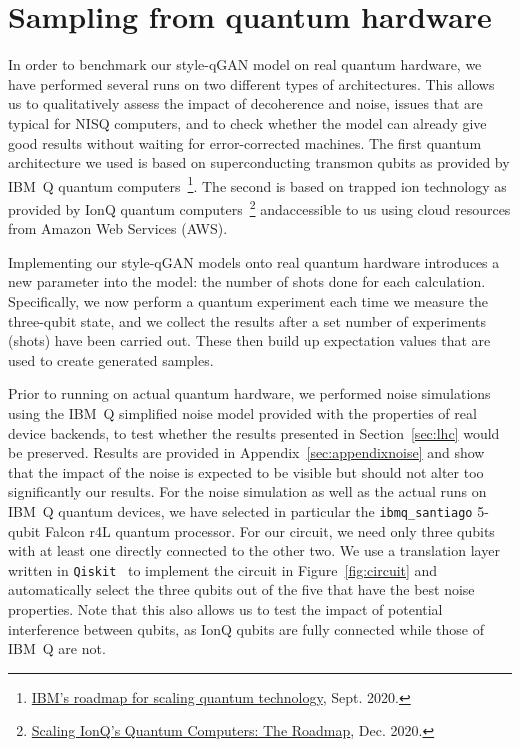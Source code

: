 \documentclass[twocolumn,preprintnumbers,superscriptaddress]{revtex4-2}
\begin{document}
\section{Sampling from quantum hardware}
\label{sec:deployment}

In order to benchmark our style-qGAN model on real quantum hardware, we
have performed several runs on two different types of
architectures. This allows us to qualitatively assess the impact of
decoherence and noise, issues that are typical for NISQ computers, and
to check whether the model can already give good results without
waiting for error-corrected machines. The first quantum architecture we used is based on
superconducting transmon qubits as provided by IBM~Q
quantum computers~\footnote{\href{https://research.ibm.com/blog/ibm-quantum-roadmap}{IBM's roadmap for scaling quantum technology}, Sept. 2020.}.
The second is based on trapped ion technology as provided by IonQ quantum computers~\footnote{\href{https://IonQ.com/posts/december-09-2020-scaling-quantum-computer-roadmap}{Scaling IonQ's Quantum Computers: The Roadmap}, Dec. 2020.}
andaccessible to us using cloud resources from Amazon Web Services (AWS).

Implementing our style-qGAN models onto real quantum hardware introduces a new parameter into the model: the number of shots done for each calculation. Specifically,  we now perform a quantum experiment each time we measure the three-qubit state, and we collect the results after a set number of experiments (shots) have been carried out. These then build up expectation values that are used to create generated samples.

 Prior to running on actual quantum hardware, we performed noise simulations using the
IBM~Q simplified noise model provided with the properties of real device backends, to test whether the results presented in Section~\ref{sec:lhc} would be preserved. Results are provided in Appendix~\ref{sec:appendixnoise} and show that the impact of the noise is expected to be visible but should not alter too significantly our
results. For the noise simulation as well as the actual runs on IBM~Q quantum devices,
we have selected in particular the {\tt ibmq\_santiago} 5-qubit Falcon r4L quantum processor. For our circuit, we need only three qubits with at least one directly connected to the other two. We use a translation layer written in \texttt{Qiskit}~\cite{gadi_aleksandrowicz_2019_2562111} to implement the circuit in Figure~\ref{fig:circuit} and automatically select the three qubits out of the five that have the best noise properties. Note that this also allows us to test the impact of potential
interference between qubits, as IonQ qubits are fully connected while those of IBM~Q are not.
\end{document}
